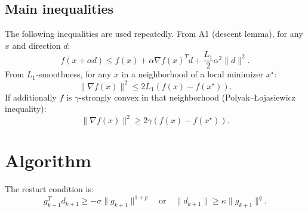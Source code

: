 \documentclass{article}
\begin{document}
\subsection{Main inequalities}

The following inequalities are used repeatedly. From A1 (descent lemma), for any $x$ and direction $d$:
\begin{equation}
\label{eq:descent_lemma}
f(x + \alpha d) \leq f(x) + \alpha \nabla f(x)^T d + \frac{L_1}{2}\alpha^2\|d\|^2.
\end{equation}
From $L_1$-smoothness, for any $x$ in a neighborhood of a local minimizer $x^\star$:
\begin{equation}
\label{eq:smooth_upper}
\|\nabla f(x)\|^2 \leq 2L_1(f(x) - f(x^\star)).
\end{equation}
If additionally $f$ is $\gamma$-strongly convex in that neighborhood (Polyak--\L{}ojasiewicz inequality):
\begin{equation}
\label{eq:PL}
\|\nabla f(x)\|^2 \geq 2\gamma(f(x) - f(x^\star)).
\end{equation}


\section{Algorithm}
\label{sec:algorithm}

The restart condition is:
\begin{equation}
\label{eq:restart}
g_{k+1}^T d_{k+1} \geq -\sigma\|g_{k+1}\|^{1+p} \quad \text{or} \quad \|d_{k+1}\| \geq \kappa\|g_{k+1}\|^q.
\end{equation}
\end{document}

